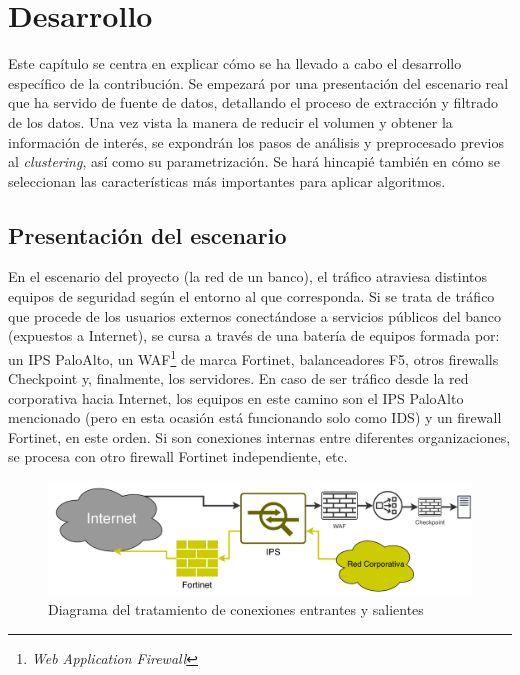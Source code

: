 \chapter{Desarrollo}\label{chap:desarrollo}

Este capítulo se centra en explicar cómo se ha llevado a cabo el desarrollo específico de la contribución.
Se empezará por una presentación del escenario real que ha servido de fuente de datos, detallando el proceso de extracción y filtrado de los datos.
Una vez vista la manera de reducir el volumen y obtener la información de interés, se expondrán los pasos de análisis y preprocesado previos al \emph{clustering}, así como su parametrización.
Se hará hincapié también en cómo se seleccionan las características más importantes para aplicar algoritmos.

\section{Presentación del escenario}\label{sec:presentaciondelescenario}

En el escenario del proyecto (la red de un banco), el tráfico atraviesa distintos equipos de seguridad según el entorno al que corresponda.
Si se trata de tráfico que procede de los usuarios externos conectándose a servicios públicos del banco (expuestos a Internet), se cursa a través de una batería de equipos formada por:
un IPS PaloAlto, un WAF\footnote{\emph{Web Application Firewall}} de marca Fortinet, balanceadores F5, otros firewalls Checkpoint y, finalmente, los servidores.
En caso de ser tráfico desde la red corporativa hacia Internet, los equipos en este camino son el IPS PaloAlto mencionado (pero en esta ocasión está funcionando solo como IDS) y un firewall Fortinet, en este orden.
Si son conexiones internas entre diferentes organizaciones, se procesa con otro firewall Fortinet independiente, etc.

\begin{figure}[h]
    \centering
    \captionsetup{width=12cm}
    \includegraphics[width=12cm]{../figures/diagrama_red.pdf}
    \caption{Diagrama del tratamiento de conexiones entrantes y salientes}
    \label{fig:diagramared}
\end{figure}

